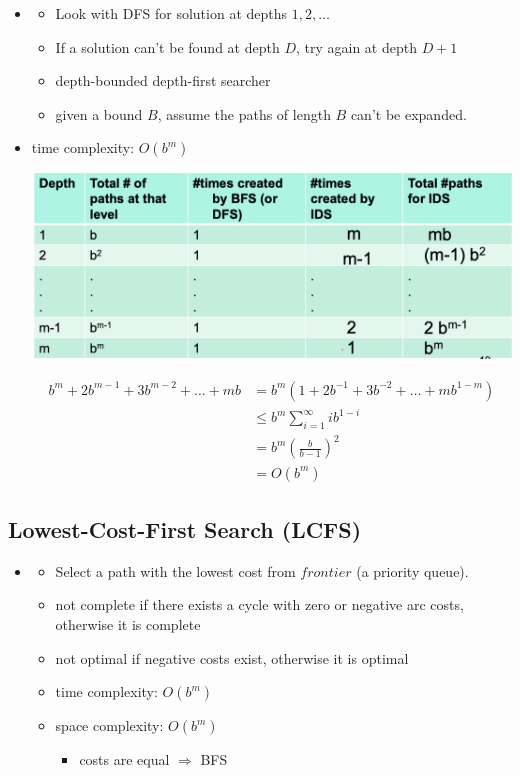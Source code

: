 \documentclass{article}
\begin{document}
\begin{itemize}
    \item
        \begin{itemize}
            \item Look with DFS for solution at depths $1, 2, \ldots$
            \item If a solution can't be found at depth $D$, try again at depth $D+1$
            \item depth-bounded depth-first searcher
            \item given a bound $B$, assume the paths of length $B$ can't be expanded.
        \end{itemize}
    \item time complexity: $O(b^m)$

    \includegraphics[scale=0.3]{ids_time_complexity}
    
    \begin{align*}
        b^m  + 2b^{m-1} + 3b^{m-2} + \ldots + mb 
        &= b^m (1 + 2b^{-1} + 3b^{-2} + \ldots + mb^{1-m}) \\
        & \leq b^m \sum\limits_{i=1}^{\infty} ib^{1-i} \\
        &= b^m (\frac{b}{b-1})^2 \\
        &= O(b^m)
    \end{align*}
\end{itemize}

\subsection{Lowest-Cost-First Search (LCFS)}

\begin{itemize}
    \item
    \begin{itemize}
        \item Select a path with the lowest cost from $frontier$ (a priority queue).
        \item not complete if there exists a cycle with zero or negative arc costs, otherwise it is complete
        \item not optimal if negative costs exist, otherwise it is optimal
        \item time complexity: $O(b^m)$
        \item space complexity: $O(b^m)$
            \begin{itemize}
                \item costs are equal $\Rightarrow$ BFS
            \end{itemize}
    \end{itemize}
\end{itemize}
\end{document}
